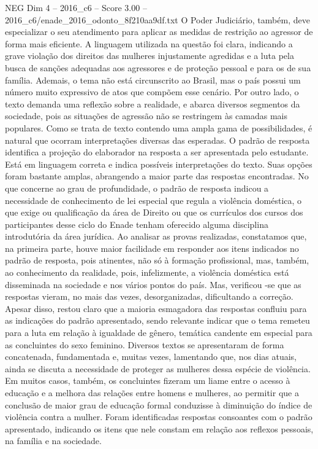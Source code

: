 \begin{textsample}{NEG Dim 4 – 2016\_c6 – Score 3.00 – 2016\_c6/enade\_2016\_odonto\_8f210aa9df.txt}
O Poder Judiciário, também, deve especializar o seu atendimento para aplicar as medidas de restrição ao agressor de forma mais eficiente.
A linguagem utilizada na questão foi clara, indicando a grave violação dos direitos das mulheres injustamente agredidas e a luta pela busca de sanções adequadas aos agressores e de proteção pessoal e para os de sua família.
Ademais, o tema não está circunscrito ao Brasil, mas o país possui um número muito expressivo de atos que compõem esse cenário.
Por outro lado, o texto demanda uma reflexão sobre a realidade, e abarca diversos segmentos da sociedade, pois as situações de agressão não se restringem às camadas mais populares.
Como se trata de texto contendo uma ampla gama de possibilidades, é natural que ocorram interpretações diversas das esperadas.
O padrão de resposta identifica a projeção do elaborador na resposta a ser apresentada pelo estudante.
Está em linguagem correta e indica possíveis interpretações do texto.
Suas opções foram bastante amplas, abrangendo a maior parte das respostas encontradas.
No que concerne ao grau de profundidade, o padrão de resposta indicou a necessidade de conhecimento de lei especial que regula a violência doméstica, o que exige ou qualificação da área de Direito ou que os currículos dos cursos dos participantes desse ciclo do Enade tenham oferecido alguma disciplina introdutória da área jurídica.
Ao analisar as provas realizadas, constatamos que, na primeira parte, houve maior facilidade em responder aos itens indicados no padrão de resposta, pois atinentes, não só à formação profissional, mas, também, ao conhecimento da realidade, pois, infelizmente, a violência doméstica está disseminada na sociedade e nos vários pontos do país.
Mas, verificou -se que as respostas vieram, no mais das vezes, desorganizadas, dificultando a correção.
Apesar disso, restou claro que a maioria esmagadora das respostas confluiu para as indicações do padrão apresentado, sendo relevante indicar que o tema remeteu para a luta em relação à igualdade de gênero, temática candente em especial para as concluintes do sexo feminino.
Diversos textos se apresentaram de forma concatenada, fundamentada e, muitas vezes, lamentando que, nos dias atuais, ainda se discuta a necessidade de proteger as mulheres dessa espécie de violência.
Em muitos casos, também, os concluintes fizeram um liame entre o acesso à educação e a melhora das relações entre homens e mulheres, ao permitir que a conclusão de maior grau de educação formal conduzisse à diminuição do índice de violência contra a mulher.
Foram identificadas respostas consoantes com o padrão apresentado, indicando os itens que nele constam em relação aos reflexos pessoais, na família e na sociedade.

\end{textsample}
